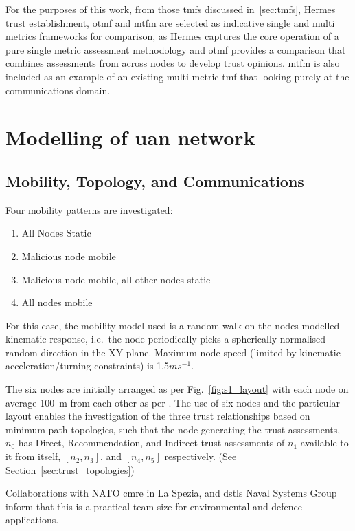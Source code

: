 For the purposes of this work, from those \glspl{tmf} discussed in~\autoref{sec:tmfs}, Hermes trust establishment, \gls{otmf} and \gls{mtfm} are selected as indicative single and multi metrics frameworks for comparison, as Hermes captures the core operation of a pure single metric assessment methodology and \gls{otmf} provides a comparison that combines assessments from across nodes to develop trust opinions.
\gls{mtfm} is also included as an example of an existing multi-metric \gls{tmf} that looking purely at the communications domain.



\section{Modelling of \gls{uan} network}\label{sec:initialsystemcharacterization}

\subsection{Mobility, Topology, and Communications}

Four mobility patterns are investigated:
\begin{enumerate}
	\item All Nodes Static
	\item Malicious node mobile
	\item Malicious node mobile, all other nodes static
	\item All nodes mobile
\end{enumerate}

For this case, the mobility model used is a random walk on the nodes modelled kinematic response, i.e.\ the node periodically picks a spherically normalised random direction in the XY plane.
Maximum node speed (limited by kinematic acceleration/turning constraints) is 1.5$ms^{-1}$.

The six nodes are initially arranged as per Fig.~\ref{fig:s1_layout} with each node on average \SI{100}{\meter} from each other as per \cite{Guo11}.
The use of six nodes and the particular layout enables the investigation of the three trust relationships based on minimum path topologies, such that the node generating the trust assessments, $n_0$ has Direct, Recommendation, and Indirect trust assessments of $n_1$ available to it from itself, $[n_2,n_3]$, and $[n_4,n_5]$ respectively. 
(See Section~\ref{sec:trust_topologies})

Collaborations with NATO \gls{cmre} in La Spezia, and \glspl{dstl} Naval Systems Group inform that this is a practical team-size for environmental and defence applications.

